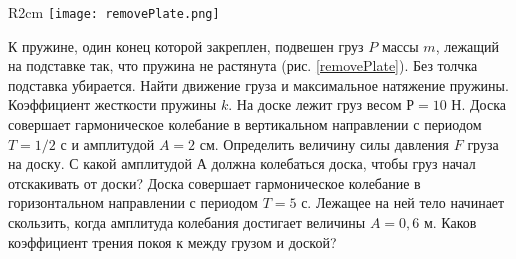 \begin{wrapfigure}[10]{R}{2cm}
\texttt{[image: removePlate.png]}
\caption{}
\label{removePlate}
\end{wrapfigure}
\AddProb К пружине, один конец которой закреплен, подвешен груз $P$ массы $m$, лежащий на подставке так, что пружина не растянута (рис. \ref{removePlate}). Без толчка подставка убирается. Найти движение груза и максимальное натяжение пружины. Коэффициент жесткости пружины $k$.
\AddProb На доске лежит груз весом $Р = 10$ Н. Доска совершает гармоническое колебание в вертикальном направлении с периодом $T = 1/2$ с и амплитудой $A = 2$ см. Определить величину силы давления $F$ груза на доску. С какой амплитудой А должна колебаться доска, чтобы груз начал отскакивать от доски?
\AddProb Доска совершает гармоническое колебание в горизонтальном
направлении с периодом $T = 5$ с. Лежащее на ней тело начинает скользить, когда амплитуда колебания достигает величины $A = 0,6$ м. Каков коэффициент трения покоя к между грузом и доской?
\clearpage